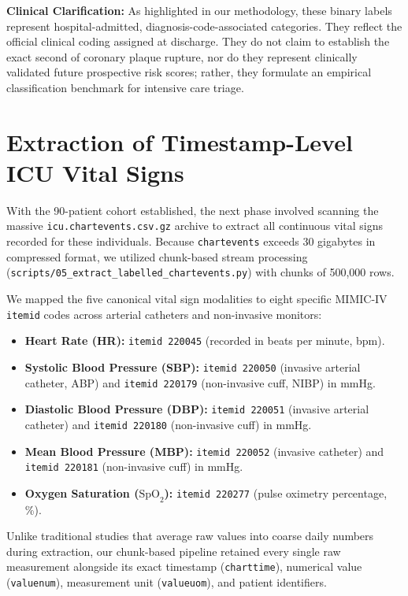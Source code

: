 \documentclass[12pt,a4paper,oneside]{report}
\begin{document}
\textbf{Clinical Clarification:} As highlighted in our methodology, these binary labels represent hospital-admitted, diagnosis-code-associated categories. They reflect the official clinical coding assigned at discharge. They do not claim to establish the exact second of coronary plaque rupture, nor do they represent clinically validated future prospective risk scores; rather, they formulate an empirical classification benchmark for intensive care triage.

\section{Extraction of Timestamp-Level ICU Vital Signs}
\label{sec:vital_sign_extraction}

With the 90-patient cohort established, the next phase involved scanning the massive \texttt{icu.chartevents.csv.gz} archive to extract all continuous vital signs recorded for these individuals. Because \texttt{chartevents} exceeds 30 gigabytes in compressed format, we utilized chunk-based stream processing (\texttt{scripts/05\_extract\_labelled\_chartevents.py}) with chunks of 500,000 rows.

We mapped the five canonical vital sign modalities to eight specific MIMIC-IV \texttt{itemid} codes across arterial catheters and non-invasive monitors:
\begin{itemize}
    \item \textbf{Heart Rate (HR):} \texttt{itemid 220045} (recorded in beats per minute, bpm).
    \item \textbf{Systolic Blood Pressure (SBP):} \texttt{itemid 220050} (invasive arterial catheter, ABP) and \texttt{itemid 220179} (non-invasive cuff, NIBP) in mmHg.
    \item \textbf{Diastolic Blood Pressure (DBP):} \texttt{itemid 220051} (invasive arterial catheter) and \texttt{itemid 220180} (non-invasive cuff) in mmHg.
    \item \textbf{Mean Blood Pressure (MBP):} \texttt{itemid 220052} (invasive catheter) and \texttt{itemid 220181} (non-invasive cuff) in mmHg.
    \item \textbf{Oxygen Saturation ($\text{SpO}_2$):} \texttt{itemid 220277} (pulse oximetry percentage, \%).
\end{itemize}

Unlike traditional studies that average raw values into coarse daily numbers during extraction, our chunk-based pipeline retained every single raw measurement alongside its exact timestamp (\texttt{charttime}), numerical value (\texttt{valuenum}), measurement unit (\texttt{valueuom}), and patient identifiers.
\end{document}
